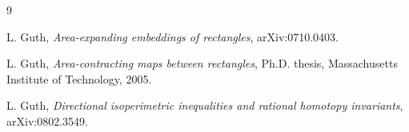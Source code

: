\documentclass[12pt]{article}
\begin{document}
\begin{thebibliography}{9}

L. Guth, \emph{Area-expanding embeddings of rectangles}, arXiv:0710.0403.

L. Guth, \emph{Area-contracting maps between rectangles}, Ph.D. thesis,
Massachusetts Institute of Technology, 2005.

L. Guth, \emph{Directional isoperimetric inequalities and rational homotopy
invariants}, arXiv:0802.3549.

\end{thebibliography}
\end{document}
